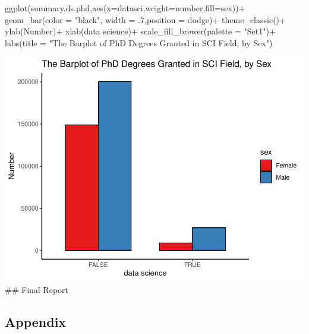 \documentclass[
  12pt,
]{article}
\newenvironment{Shaded}{\begin{snugshade}}{\end{snugshade}}
\newcommand{\AttributeTok}[1]{\textcolor[rgb]{0.77,0.63,0.00}{#1}}
\newcommand{\DecValTok}[1]{\textcolor[rgb]{0.00,0.00,0.81}{#1}}
\newcommand{\FunctionTok}[1]{\textcolor[rgb]{0.00,0.00,0.00}{#1}}
\newcommand{\NormalTok}[1]{#1}
\newcommand{\SpecialCharTok}[1]{\textcolor[rgb]{0.00,0.00,0.00}{#1}}
\newcommand{\StringTok}[1]{\textcolor[rgb]{0.31,0.60,0.02}{#1}}
\begin{document}
\begin{Shaded}
\begin{Highlighting}[]
\FunctionTok{ggplot}\NormalTok{(summary.ds.phd,}\FunctionTok{aes}\NormalTok{(}\AttributeTok{x=}\NormalTok{datasci,}\AttributeTok{weight=}\NormalTok{number,}\AttributeTok{fill=}\NormalTok{sex))}\SpecialCharTok{+}
  \FunctionTok{geom\_bar}\NormalTok{(}\AttributeTok{color =} \StringTok{"black"}\NormalTok{, }\AttributeTok{width =}\NormalTok{ .}\DecValTok{7}\NormalTok{,}\AttributeTok{position =} \StringTok{\textquotesingle{}dodge\textquotesingle{}}\NormalTok{)}\SpecialCharTok{+}
  \FunctionTok{theme\_classic}\NormalTok{()}\SpecialCharTok{+}
  \FunctionTok{ylab}\NormalTok{(}\StringTok{\textquotesingle{}Number\textquotesingle{}}\NormalTok{)}\SpecialCharTok{+}
  \FunctionTok{xlab}\NormalTok{(}\StringTok{\textquotesingle{}data science\textquotesingle{}}\NormalTok{)}\SpecialCharTok{+}
  \FunctionTok{scale\_fill\_brewer}\NormalTok{(}\AttributeTok{palette =} \StringTok{"Set1"}\NormalTok{)}\SpecialCharTok{+}
  \FunctionTok{labs}\NormalTok{(}\AttributeTok{title =} \StringTok{"The Barplot of PhD Degrees Granted in SCI Field, by Sex"}\NormalTok{)}
\end{Highlighting}
\end{Shaded}

\includegraphics{hw1_sol_files/figure-latex/unnamed-chunk-12-3.pdf} \#\#
Final Report

\hypertarget{appendix}{%
\subsection{Appendix}\label{appendix}}
\end{document}
